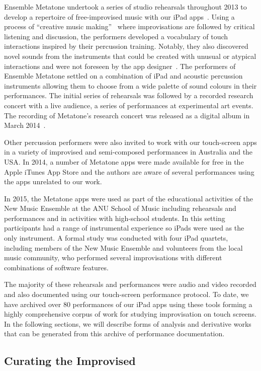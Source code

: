 \documentclass[graybox]{svmult}
\begin{document}
Ensemble Metatone undertook a series of studio rehearsals throughout
2013 to develop a repertoire of free-improvised music with our iPad
apps~\cite{Martin:2014jk}. Using a process of ``creative music
making''~\cite{Cahn:2005uq} where improvisations are followed by
critical listening and discussion, the performers developed a
vocabulary of touch interactions inspired by their percussion
training. Notably, they also discovered novel sounds from the
instruments that could be created with unusual or atypical
interactions and were not foreseen by the app
designer~\cite{Martin:2014cr}. The performers of Ensemble Metatone
settled on a combination of iPad and acoustic percussion instruments
allowing them to choose from a wide palette of sound colours in their
performances. The initial series of rehearsals was followed by a
recorded research concert with a live audience, a series of
performances at experimental art events. The recording of Metatone's
research concert was released as a digital album in March
2014~\cite{Ensemble-Metatone:2014sf}.

Other percussion performers were also invited to work with our
touch-screen apps in a variety of improvised and semi-composed
performances in Australia and the USA. In 2014, a number of Metatone
apps were made available for free in the Apple iTunes App Store and
the authors are aware of several performances using the apps unrelated
to our work.

In 2015, the Metatone apps were used as part of the educational
activities of the New Music Ensemble at the ANU School of Music
including rehearsals and performances and in activities with
high-school students. In this setting participants had a range of
instrumental experience so iPads were used as the only instrument. A
formal study was conducted with four iPad quartets, including members
of the New Music Ensemble and volunteers from the local music
community, who performed several improvisations with different
combinations of software features.

The majority of these rehearsals and performances were audio and video
recorded and also documented using our touch-screen performance
protocol. To date, we have archived over 80 performances of our iPad
apps using these tools forming a highly comprehensive corpus of work
for studying improvisation on touch screens. In the following
sections, we will describe forms of analysis and derivative works that
can be generated from this archive of performance documentation.

\subsection{Curating the Improvised}
\label{subsec:curating}
\end{document}
